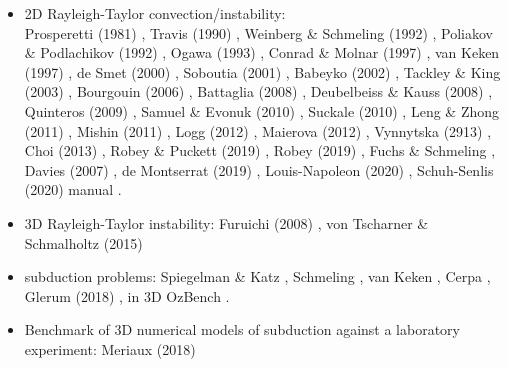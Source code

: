 \begin{itemize}
\item 2D Rayleigh-Taylor convection/instability:\\ 
      Prosperetti (1981) \cite{pros81},
      Travis \etal (1990) \cite{trab90},
      Weinberg \& Schmeling (1992) \cite{wesc92},
      Poliakov \& Podlachikov (1992) \cite{popo92},
      Ogawa (1993) \cite{ogaw93},
      Conrad \& Molnar (1997) \cite{como97},
      van Keken \etal (1997) \cite{vaks97},
      de Smet \etal (2000) \cite{devv00a},
      Soboutia \etal (2001) \cite{soga01},
      Babeyko \etal (2002) \cite{bast02},
      Tackley \& King (2003) \cite{taki03},
      Bourgouin \etal (2006) \cite{bomh06},
      Battaglia \etal (2008) \cite{basd08},
      Deubelbeiss \& Kauss (2008) \cite{deka08},
      Quinteros \etal (2009) \cite{qurj09},
      Samuel \& Evonuk (2010) \cite{saev10},
      Suckale \etal (2010) \cite{sunh10},
      Leng \& Zhong (2011) \cite{lezh11},
      Mishin (2011) \cite{mishin11}, 
      Logg \etal (2012) \cite{lomw12}, 
      Maierova (2012) \cite{maie12},
      Vynnytska \etal (2913) \cite{vyrc13}, 
      Choi \etal (2013) \cite{chtl13},
      Robey \& Puckett (2019) \cite{ropu19},
      Robey (2019) \cite{robe19}, 
      Fuchs \& Schmeling \cite{fusc13}, 
      Davies \etal (2007) \cite{dadh07},
      de Montserrat \etal (2019) \cite{demh19},
      Louis-Napoleon \etal (2020) \cite{logb20},
      Schuh-Senlis \etal (2020) \cite{sctc20}
      \aspect manual \cite{aspectmanual}.
\item 3D Rayleigh-Taylor instability:
      Furuichi \etal (2008) \cite{fukk08},
      von Tscharner \& Schmalholtz (2015) \cite{vosc15}

\item subduction problems: Spiegelman \& Katz \cite{spka06}, Schmeling \etal \cite{scbe08}, 
                           van Keken \etal \cite{vack08}, Cerpa \etal \cite{cehg14},
                           Glerum \etal (2018) \cite{gltf18}, in 3D OzBench \etal \cite{ozrs08}.
\item Benchmark of 3D numerical models of subduction against a laboratory experiment: 
      Meriaux \etal (2018)  \cite{memm18}


\end{itemize}

